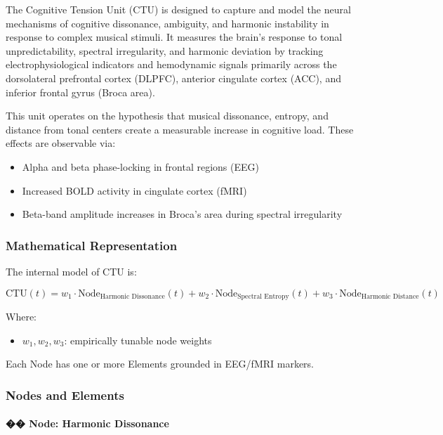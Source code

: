 The Cognitive Tension Unit (CTU) is designed to capture and model the neural mechanisms of cognitive dissonance, ambiguity, and harmonic instability in response to complex musical stimuli. It measures the brain’s response to tonal unpredictability, spectral irregularity, and harmonic deviation by tracking electrophysiological indicators and hemodynamic signals primarily across the dorsolateral prefrontal cortex (DLPFC), anterior cingulate cortex (ACC), and inferior frontal gyrus (Broca area).

This unit operates on the hypothesis that musical dissonance, entropy, and distance from tonal centers create a measurable increase in cognitive load. These effects are observable via:

\begin{itemize}
    \item Alpha and beta phase-locking in frontal regions (EEG)
    \item Increased BOLD activity in cingulate cortex (fMRI)
    \item Beta-band amplitude increases in Broca’s area during spectral irregularity
\end{itemize}

\subsubsection*{Mathematical Representation}

The internal model of CTU is:

\[
\text{CTU}(t) = w_1 \cdot \text{Node}_{\text{Harmonic Dissonance}}(t) + w_2 \cdot \text{Node}_{\text{Spectral Entropy}}(t) + w_3 \cdot \text{Node}_{\text{Harmonic Distance}}(t)
\]

Where:

\begin{itemize}
    \item $w_1, w_2, w_3$: empirically tunable node weights
\end{itemize}

Each Node has one or more Elements grounded in EEG/fMRI markers.

\subsubsection*{Nodes and Elements}

\paragraph{�� Node: Harmonic Dissonance}

